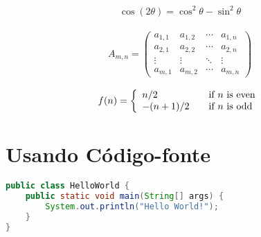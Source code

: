 \lipsum[4]

	\begin{equation}
		\begin{aligned}
			\cos (2\theta) = \cos^2 \theta - \sin^2 \theta
		\end{aligned}
	\end{equation}
	
\lipsum[5]

	\begin{equation}
		\begin{aligned}
			A_{m,n} =
			\begin{pmatrix}
			a_{1,1} & a_{1,2} & \cdots & a_{1,n} \\
			a_{2,1} & a_{2,2} & \cdots & a_{2,n} \\
			\vdots  & \vdots  & \ddots & \vdots  \\
			a_{m,1} & a_{m,2} & \cdots & a_{m,n}
			\end{pmatrix}
		\end{aligned}
	\end{equation}

\lipsum[6]

	\begin{equation}
		\begin{aligned}
			f(n) = \left\{ 
			\begin{array}{l l}
			n/2 & \quad \text{if $n$ is even}\\
			-(n+1)/2 & \quad \text{if $n$ is odd}
			\end{array} \right.
		\end{aligned}
	\end{equation}
	
\lipsum[7]

\lipsum[8]

\lipsum[9]

\section{Usando Código-fonte}

\lipsum[10]



\lipsum[11]

\begin{lstlisting}[language=Java,caption={Hello World em Java}]
public class HelloWorld {
	public static void main(String[] args) {
		System.out.println("Hello World!");
	}
}
\end{lstlisting}

